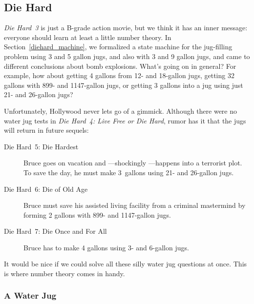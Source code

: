 \subsection{Die Hard}

\emph{Die Hard~3} is just a B-grade action movie, but we think it has
an inner message: everyone should learn at least a little number
theory.  In Section~\ref{diehard_machine}, we formalized a state
machine for the  jug-filling problem using 3 and 5
gallon jugs, and also with 3 and 9 gallon jugs, and came to different
conclusions about bomb explosions.  What's going on in general?  For
example, how about getting 4 gallons from 12- and 18-gallon jugs,
getting 32 gallons with 899- and 1147-gallon jugs, or getting 3
gallons into a jug using just 21- and 26-gallon jugs?

\begin{editingnotes}
Unfortunately, Hollywood never lets go of a gimmick.  Although there
were no water jug tests in \emph{Die Hard~4: Live Free or Die Hard},
rumor has it that the jugs will return in future sequels:
\begin{description}

\item[Die Hard~5: Die Hardest] Bruce goes on vacation and ---shockingly ---happens into a
  terrorist plot.  To save the day, he must make 3~gallons using 21- and 26-gallon jugs.

\item[Die Hard~6: Die of Old Age] Bruce must save his assisted living facility from a
  criminal mastermind by forming 2 gallons with 899- and 1147-gallon jugs.

\item[Die Hard~7: Die Once and For All] Bruce has to make 4 gallons using 3- and 6-gallon
  jugs.

\end{description}
\end{editingnotes}

It would be nice if we could solve all these silly water jug questions at once.  \iffalse
In particular, how can one form $g$ gallons using jugs with capacities $a$ and~$b$?\fi This
is where number theory comes in handy.

\subsubsection{A Water Jug }\label{jug_invar_subsubsec}

